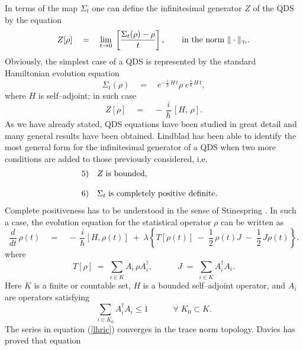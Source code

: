 \documentclass[12pt]{article}
\begin{document}
In terms of the map $\Sigma_{t}$ one can define the infinitesimal
generator $Z$ of the QDS by the equation
\begin{equation}
Z[\rho] \quad = \quad {\displaystyle \lim_{t\rightarrow 0}}\;
\left[ \frac{\Sigma_{t}(\rho) - \rho}{t} \right], \qquad
\makebox{in the norm $\| \cdot \|_{\makebox{\tiny Tr}}$.}
\end{equation}
Obviously, the simplest case of a QDS is represented by the
standard Hamiltonian evolution equation
\begin{equation}
\Sigma_{t}(\rho) \quad = \quad e^{\displaystyle -
\frac{i}{\hbar}\, H\, t} \rho\;  e^{\displaystyle
\frac{i}{\hbar}\, H\, t},
\end{equation}
where $H$ is self--adjoint; in such case
\begin{equation}
Z[\rho] \quad = \quad -\, \frac{i}{\hbar}\, [H, \,\rho].
\end{equation}
As we have already stated, QDS equations have been studied in
great detail \cite{dav} and many general results have been
obtained. Lindblad \cite{lin} has been able to identify the most
general form for the infinitesimal generator of a QDS when two
more conditions are added to those previously considered, i.e.
\[
\begin{array}{lll}
5) & Z \; \makebox{is bounded}, & \\
& & \\
6) & \Sigma_{t} \; \makebox{is completely positive definite}. &
\end{array}
\]
Complete positiveness has to be understood in the sense of
Stinespring \cite{sti}. In such a case, the evolution equation for
the statistical operator $\rho$ can be written as
\begin{equation} \label{vsqchd}
\frac{d}{dt}\, \rho(t) \quad = \quad -\, \frac{i}{\hbar} [H
,\rho(t)] \; + \; \lambda \left\{ T[\rho(t)] \; - \; \frac{1}{2}\,
\rho(t) J \; - \; \frac{1}{2}\, J \rho(t) \right\}.
\end{equation}
where
\begin{equation} \label{lhric}
T[\rho] \; = \; \sum_{i\in K} A_{i}\, \rho A^{\dagger}_{i},
\qquad\quad J \; = \; \sum_{i\in K} A^{\dagger}_{i} A_{i}.
\end{equation}
Here $K$ is a finite or countable set, $H$ is a bounded
self--adjoint operator, and $A_{i}$ are operators satisfying
\[
\sum_{i\in K_{0}} A^{\dagger}_{i} A_{i} \leq 1 \qquad \quad
\forall\; K_{0}\subset K.
\]
The series in equation (\ref{lhric}) converges in the trace norm
topology. Davies \cite{dav} has proved that equation
\end{document}
